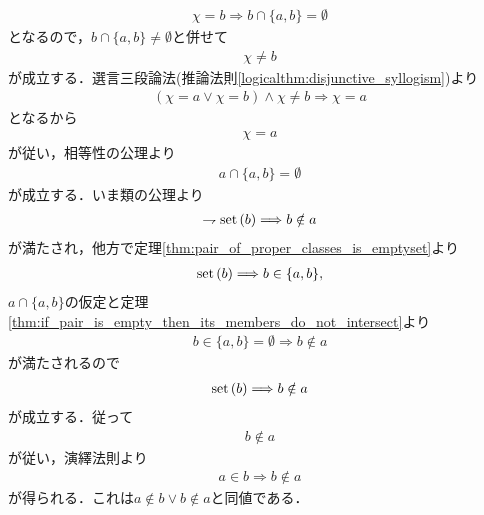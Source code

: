\begin{prf}
\begin{description}
\begin{align}
					\chi = b \Longrightarrow b \cap \{a,b\} = \emptyset
				\end{align}
				となるので，$b \cap \{a,b\} \neq \emptyset$と併せて
				\begin{align}
					\chi \neq b
				\end{align}
				が成立する．選言三段論法(推論法則\ref{logicalthm:disjunctive_syllogism})より
				\begin{align}
					(\chi = a \vee \chi = b) \wedge \chi \neq b \Longrightarrow \chi = a
				\end{align}
				となるから
				\begin{align}
					\chi = a
				\end{align}
				が従い，相等性の公理より
				\begin{align}
					a \cap \{a,b\} = \emptyset
				\end{align}
				が成立する．いま類の公理より
				\begin{align}
					\rightharpoondown \operatorname*{set} \left(b\right) \Longrightarrow b \notin a
				\end{align}
				が満たされ，他方で定理\ref{thm:pair_of_proper_classes_is_emptyset}より
				\begin{align}
					\operatorname*{set} \left(b\right) \Longrightarrow b \in \{a,b\},
				\end{align}
				$a \cap \{a,b\}$の仮定と定理\ref{thm:if_pair_is_empty_then_its_members_do_not_intersect}より
				\begin{align}
					b \in \{a,b\} = \emptyset \Longrightarrow b \notin a
				\end{align}
				が満たされるので
				\begin{align}
					\operatorname*{set} \left(b\right) \Longrightarrow b \notin a
				\end{align}
				が成立する．従って
				\begin{align}
					b \notin a
				\end{align}
				が従い，演繹法則より
				\begin{align}
					a \in b \Longrightarrow b \notin a
				\end{align}
				が得られる．これは$a \notin b \vee b \notin a$と同値である．
				

\end{description}
\end{prf}
